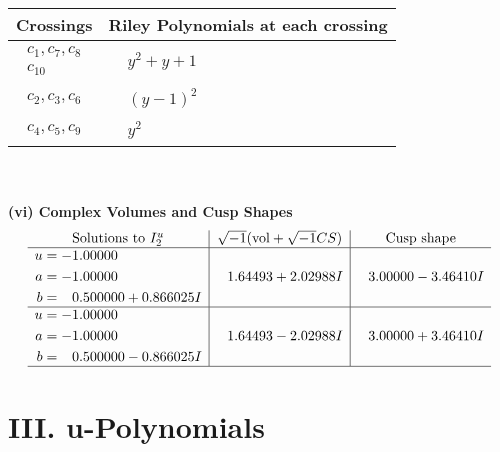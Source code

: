\documentclass[1p]{elsarticle_modified}
\theoremstyle{definition}
\newcommand{\I}{\sqrt{-1}}
\begin{document}
\begin{tabular}{m{50pt}|m{274pt}}
Crossings & \hspace{64pt}Riley Polynomials at each crossing \\
\hline $$\begin{aligned}c_{1},c_{7},c_{8}\\c_{10}\end{aligned}$$&$\begin{aligned}
&y^2+y+1
\end{aligned}$\\
\hline $$\begin{aligned}c_{2},c_{3},c_{6}\end{aligned}$$&$\begin{aligned}
&(y-1)^2
\end{aligned}$\\
\hline $$\begin{aligned}c_{4},c_{5},c_{9}\end{aligned}$$&$\begin{aligned}
&y^2
\end{aligned}$\\
\hline
\end{tabular}\\~\\
\newpage\flushleft \textbf{(vi) Complex Volumes and Cusp Shapes}
$$\begin{array}{c|c|c}  
\text{Solutions to }I^u_{2}& \I (\text{vol} + \sqrt{-1}CS) & \text{Cusp shape}\\
 \hline 
\begin{aligned}
u &= -1.00000\phantom{ +0.000000I} \\
a &= -1.00000\phantom{ +0.000000I} \\
b &= \phantom{-}0.500000 + 0.866025 I\end{aligned}
 & \phantom{-}1.64493 + 2.02988 I & \phantom{-}3.00000 - 3.46410 I \\ \hline\begin{aligned}
u &= -1.00000\phantom{ +0.000000I} \\
a &= -1.00000\phantom{ +0.000000I} \\
b &= \phantom{-}0.500000 - 0.866025 I\end{aligned}
 & \phantom{-}1.64493 - 2.02988 I & \phantom{-}3.00000 + 3.46410 I\\
 \hline 
 \end{array}$$\newpage
\newpage\renewcommand{\arraystretch}{1}
\centering \section*{ III. u-Polynomials}
\end{document}
